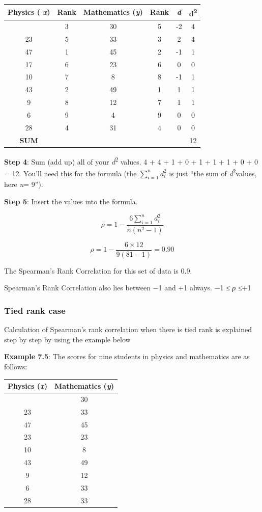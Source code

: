 \documentclass[
]{book}
\begin{document}
\begin{longtable}[]{@{}cccccc@{}}
\toprule\noalign{}
Physics ( \emph{x}) & Rank & Mathematics (\emph{y}) & Rank & \emph{d} & d\textsuperscript{2} \\
\midrule\noalign{}
\endhead
\bottomrule\noalign{}
\endlastfoot
35 & 3 & 30 & 5 & -2 & 4 \\
23 & 5 & 33 & 3 & 2 & 4 \\
47 & 1 & 45 & 2 & -1 & 1 \\
17 & 6 & 23 & 6 & 0 & 0 \\
10 & 7 & 8 & 8 & -1 & 1 \\
43 & 2 & 49 & 1 & 1 & 1 \\
9 & 8 & 12 & 7 & 1 & 1 \\
6 & 9 & 4 & 9 & 0 & 0 \\
28 & 4 & 31 & 4 & 0 & 0 \\
\textbf{SUM} & & & & & 12 \\
\end{longtable}

\textbf{Step 4}: Sum (add up) all of your \emph{d}\textsuperscript{2} values. 4 + 4 + 1 + 0 + 1 +
1 + 1 + 0 + 0 = 12. You'll need this for the formula (the
\(\sum_{i = 1}^{n}d_{i}^{2}\) is just ``the sum of \emph{d}\textsuperscript{2}values, here \emph{n}=
9'').

\textbf{Step 5}: Insert the values into the formula.

\[\rho = 1 - \frac{6\sum_{i = 1}^{n}d_{i}^{2}}{n\left( n^{2} - 1 \right)}\]

\[\rho = 1 - \frac{6 \times 12}{9\left( 81 - 1 \right)} = 0.90\]

The Spearman's Rank Correlation for this set of data is 0.9.

Spearman's Rank Correlation also lies between −1 and +1 always. −1 ≤ \emph{ρ}
≤+1

\hypertarget{tied-rank-case}{%
\subsubsection{Tied rank case}\label{tied-rank-case}}

Calculation of Spearman's rank correlation when there is tied rank is
explained step by step by using the example below

\textbf{Example 7.5}: The scores for nine students in physics and mathematics
are as follows:

\begin{longtable}[]{@{}cc@{}}
\toprule\noalign{}
Physics (\emph{x}) & Mathematics (\emph{y}) \\
\midrule\noalign{}
\endhead
\bottomrule\noalign{}
\endlastfoot
35 & 30 \\
23 & 33 \\
47 & 45 \\
23 & 23 \\
10 & 8 \\
43 & 49 \\
9 & 12 \\
6 & 33 \\
28 & 33 \\
\end{longtable}
\end{document}
